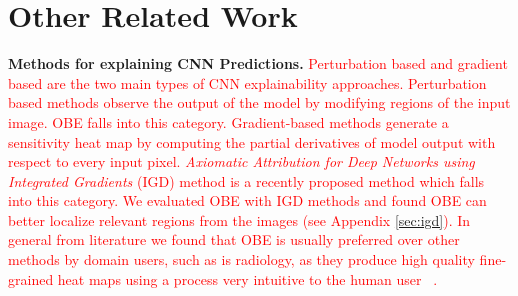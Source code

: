 \documentclass[10pt, sigconf]{acmart}
\newcommand{\red}{\textcolor{red}}
\begin{document}
\section{Other Related Work}

\vspace{2mm}
\noindent \textbf{Methods for explaining CNN Predictions.}
\red{Perturbation based and gradient based are the two main types of CNN explainability approaches.
Perturbation based methods \cite{zeiler2014visualizing,zintgraf2017visualizing,ribeiro2016should} observe the output of the model by modifying regions of the input image.
OBE falls into this category.}
\red{Gradient-based methods \cite{simonyan2013deep,selvaraju2017grad,sundararajan2017axiomatic} generate a sensitivity heat map by computing the partial derivatives of model output with respect to every input pixel.
\textit{Axiomatic Attribution for Deep Networks using Integrated Gradients} (IGD) method \cite{sundararajan2017axiomatic} is a recently proposed method which falls into this category.
We evaluated OBE with IGD methods and found OBE can better localize relevant regions from the images (see Appendix \ref{sec:igd}).
In general from literature we found that OBE is usually preferred over other methods by domain users, such as is radiology, as they produce high quality fine-grained heat maps using a process very intuitive to the human user ~\cite{jung2017deep,miller2017explanation}.}


\end{document}
